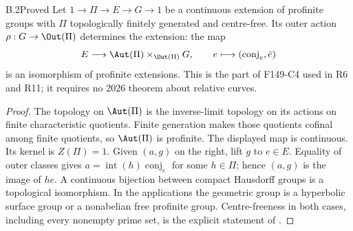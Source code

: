 \begin{claim}{B.2}{Proved}
Let $1\to\Pi\to E\to G\to1$ be a continuous extension of profinite groups
with $\Pi$ topologically finitely generated and centre-free. Its outer action
$\rho:G\to\Out(\Pi)$ determines the extension: the map
\[
 E\longrightarrow\Aut(\Pi)\times_{\Out(\Pi)}G,
 \qquad e\longmapsto(\operatorname{conj}_e,\bar e)
\]
is an isomorphism of profinite extensions. This is the part of F149-C4 used
in R6 and R11; it requires no 2026 theorem about relative curves.
\end{claim}
\begin{proof}
The topology on $\Aut(\Pi)$ is the inverse-limit topology on its actions on
finite characteristic quotients. Finite generation makes those quotients
cofinal among finite quotients, so $\Aut(\Pi)$ is profinite. The displayed map
is continuous. Its kernel is $Z(\Pi)=1$. Given $(a,g)$ on the right, lift
$g$ to $e\in E$. Equality of outer classes gives
$a=\operatorname{int}(h)\operatorname{conj}_e$ for some $h\in\Pi$; hence
$(a,g)$ is the image of $he$. A continuous bijection between compact
Hausdorff groups is a topological isomorphism. In the applications the
geometric group is a hyperbolic surface group or a nonabelian free profinite
group. Centre-freeness in both cases, including every nonempty prime set,
is the explicit statement of \citet[Remark 1.1.3]{BC_MochComb}.
\end{proof}

